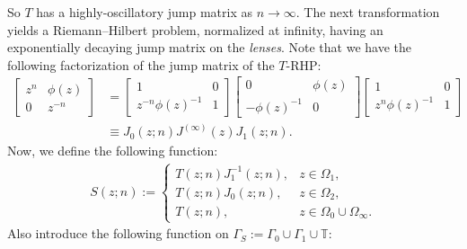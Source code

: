\documentclass[pdftex]{sigma}
\numberwithin{equation}{section}
\newcommand{\T}{{\mathbb T}}
\newcommand{\Ga}{\Gamma}
\newcommand{\Om}{\Omega}
\begin{document}
		So $T$ has a highly-oscillatory jump matrix as $n \to \infty$. The next transformation yields a Riemann--Hilbert problem, normalized at infinity, having an exponentially decaying jump matrix on the \textit{lenses}. Note that we have the following factorization of the jump matrix of the $T$-RHP:
\begin{align*}%
			\begin{bmatrix}
				z^n & \phi(z) \\
				0 & z^{-n}
			\end{bmatrix} &= \begin{bmatrix}
				1 & 0 \\
				z^{-n}\phi(z)^{-1} & 1
			\end{bmatrix}\begin{bmatrix}
				0 & \phi(z) \\
				-\phi(z)^{-1} & 0
			\end{bmatrix}\begin{bmatrix}
				1 & 0 \\
				z^{n}\phi(z)^{-1} & 1
			\end{bmatrix}\\
& \equiv J_{0}(z;n)J^{(\infty)}(z)J_{1}(z;n).
		\end{align*}
		Now, we define the following function: \begin{gather*}%
			S(z;n):=\begin{cases}
				T(z;n)J^{-1}_{1}(z;n), & z \in \Om_1, \\
				T(z;n)J_{0}(z;n), & z \in \Om_2, \\
				T(z;n), & z\in \Om_0\cup \Om_{\infty}.
			\end{cases}
		\end{gather*}
		Also introduce the following function on $\Ga_S := \Ga_0 \cup \Ga_1 \cup \T$:
\end{document}
